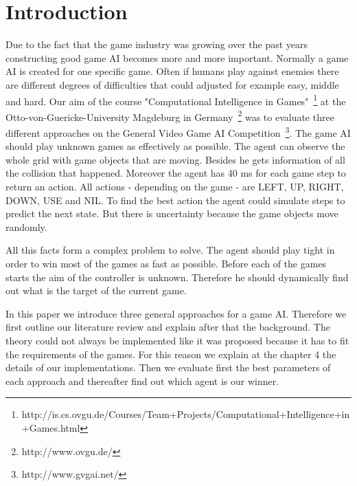 \section{Introduction} 
\label{sec:intro}


Due to the fact that the game industry was growing over the past years~\cite{gartner}
constructing good game \ac{AI} becomes more and more important.
Normally a game \ac{AI} is created for one specific game. Often if humans play against
enemies there are different degrees of difficulties that could adjusted for example easy, middle and hard.
Our aim of the course "Computational Intelligence in Games"~\footnote{http://is.cs.ovgu.de/Courses/Team+Projects/Computational+Intelligence+in+Games.html} at the Otto-von-Guericke-University Magdeburg in Germany~\footnote{http://www.ovgu.de/} was
to evaluate three different approaches on the General Video Game AI Competition~\footnote{http://www.gvgai.net/}.
The game AI should play unknown games as effectively as possible. The agent can observe the
whole grid with game objects that are moving. Besides he gets information of all the collision that happened.
Moreover the agent has 40 ms for each game step to return an action. All actions - depending on the game - are  LEFT, UP, RIGHT, DOWN, USE and NIL.
To find the best action the agent could simulate steps to predict the next state. But there is uncertainty because the game objects move randomly.

All this facts form a complex problem to solve. The agent should play tight in order to win most of the games as fast as possible. 
Before each of the games starts the aim of the controller is unknown. Therefore he should dynamically find out what is the target of the current game.

In this paper we introduce three general approaches for a game \ac{AI}. Therefore we first outline our literature review and explain after that
the background. The theory could not always be implemented like it was proposed because it has to
fit the requirements of the games. For this reason we explain at the chapter 4 the details of our implementations.
Then we evaluate first the best parameters of each approach and thereafter find out which agent is our winner.








